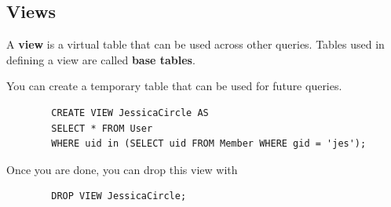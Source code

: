 \documentclass{article}
\begin{document}
  \subsection{Views}

    \begin{definition}[View]
      A \textbf{view} is a virtual table that can be used across other queries. Tables used in defining a view are called \textbf{base tables}. 
    \end{definition}

    \begin{example}
      You can create a temporary table that can be used for future queries. 
      \begin{lstlisting}
        CREATE VIEW JessicaCircle AS 
        SELECT * FROM User 
        WHERE uid in (SELECT uid FROM Member WHERE gid = 'jes'); 
      \end{lstlisting}
      Once you are done, you can drop this view with 
      \begin{lstlisting}
        DROP VIEW JessicaCircle; 
      \end{lstlisting}
    \end{example}
\end{document}
